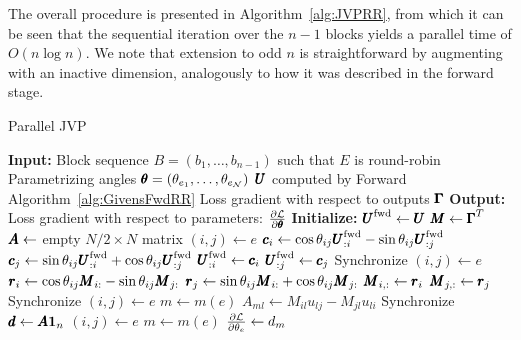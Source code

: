 \documentclass[superscriptaddress,floatfix]{article}
\begin{document}
The overall procedure is presented in Algorithm~\ref{alg:JVPRR}, from
which it can be seen that the sequential iteration over the $n-1$
blocks yields a parallel time of $O(n\log n)$. We note that extension
to odd $n$ is straightforward by augmenting with an inactive dimension,
analogously to how it was described in the forward stage.
\begin{algorithm}[H]
  \caption{Parallel JVP}
  \label{alg:JVPRR}
  \begin{algorithmic}[0] %
    \State \textbf{Input:}
    \State \hspace*{\algorithmicindent} Block sequence $B = ( b_1, \ldots, b_{n-1})$ such that $E$ is round-robin
    \State \hspace*{\algorithmicindent} Parametrizing angles ${\pmb{\theta}} = (\theta_{e_1}, \ldots, \theta_{e_{\mathcal{N}}})$
    \State \hspace*{\algorithmicindent} ${\pmb{U}}$ computed by Forward Algorithm~\ref{alg:GivensFwdRR}
    \State \hspace*{\algorithmicindent} Loss gradient with respect to outputs ${\pmb{\Gamma}}$
    \State \textbf{Output:}
    \State \hspace*{\algorithmicindent} Loss gradient with respect to parameters: $ \frac{\partial\mathcal{L}}{\partial{\pmb{\theta}}} $
    \State \textbf{Initialize:}
    \State \hspace*{\algorithmicindent} ${\pmb{U}}^{\textrm{fwd}} \gets {\pmb{U}}$
    \State \hspace*{\algorithmicindent} ${\pmb{M}} \gets {\pmb{\Gamma}}^T $
    \State \hspace*{\algorithmicindent} ${\pmb{A}} \gets$ empty $N/2 \times N$ matrix
       
        \State $(i,j) \gets e$
        \State ${\pmb{c}}_i \gets \cos\theta_{ij}{\pmb{U}}^{\textrm{fwd}}_{:i} - \sin\theta_{ij}{\pmb{U}}^{\textrm{fwd}}_{:j}$
        \State ${\pmb{c}}_j \gets \sin\theta_{ij}{\pmb{U}}^{\textrm{fwd}}_{:i} + \cos\theta_{ij}{\pmb{U}}^{\textrm{fwd}}_{:j}$
        \State ${\pmb{U}}^{\textrm{fwd}}_{:i} \gets {\pmb{c}}_i$
        \State ${\pmb{U}}^{\textrm{fwd}}_{:j} \gets {\pmb{c}}_j$
      \EndFor
      \State Synchronize
       
        \State $(i,j) \gets e$
        \State ${\pmb{r}}_i \gets \cos\theta_{ij}{\pmb{M}}_{i:} - \sin\theta_{ij}{\pmb{M}}_{j:}$
        \State ${\pmb{r}}_j \gets \sin\theta_{ij}{\pmb{M}}_{i:} + \cos\theta_{ij}{\pmb{M}}_{j:}$
        \State ${\pmb{M}}_{i,:} \gets {\pmb{r}}_i$ 
        \State ${\pmb{M}}_{j,:} \gets {\pmb{r}}_j$
      \EndFor
      \State Synchronize
        
        \State $(i,j) \gets e$
        \State $m \gets m(e)$
          
          \State $A_{ml} \gets M_{il}u_{lj} - M_{jl}u_{li}$
        \EndFor
      \EndFor
      \State Synchronize
      \State ${\pmb{d}} \gets {\pmb{A}} \mathbf{1}_n$ 
        
        \State $(i,j) \gets e$
        \State $m \gets m(e)$
        \State $\frac{\partial\mathcal{L}}{\partial\theta_e} \gets d_{m}$
      \EndFor
    \EndFor
  \end{algorithmic}
\end{algorithm}
\end{document}
